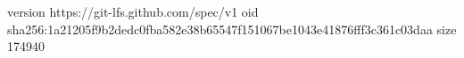 version https://git-lfs.github.com/spec/v1
oid sha256:1a21205f9b2dedc0fba582e38b65547f151067be1043e41876fff3c361c03daa
size 174940

